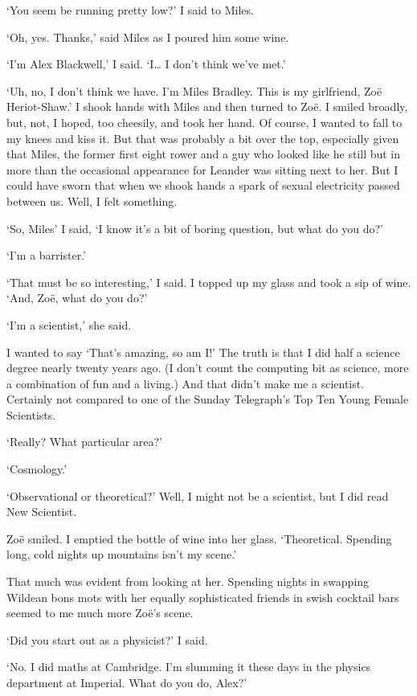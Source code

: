 `You seem be running pretty low?' I said to Miles.

`Oh, yes. Thanks,' said Miles as I poured him some wine.

`I'm Alex Blackwell,' I said. `I{\dots} I don't think we've met.'

`Uh, no, I don't think we have. I'm Miles Bradley. This is my
girlfriend, Zoë Heriot-Shaw.' I shook hands with Miles and then
turned to Zoë. I smiled broadly, but, not, I hoped, too
cheesily, and took her hand. Of course, I wanted to fall to my knees and kiss it. But
that was probably a bit over the top, especially given that
Miles, the former first eight rower and a guy who looked like he still
but in more than the occasional appearance for Leander was sitting
next to her. But I could have sworn that when we shook hands a spark
of sexual electricity passed between us. Well, I felt something.

`So, Miles' I said, `I know it's a bit of boring question, but what
do you do?'

`I'm a barrister.'

`That must be so interesting,' I said. I topped up my glass and
took a sip of wine. `And, Zoë, what do you do?'

`I'm a scientist,' she said.

I wanted to say `That's amazing, so am I!' The truth is that I did half a science degree nearly
twenty years ago. (I don't count the computing bit as science, more
a combination of fun and a living.) And that didn't make me a
scientist. Certainly not compared to one of the {\twelvesl Sunday
Telegraph}'s Top Ten Young Female Scientists.

`Really? What particular area?'

`Cosmology.'

`Observational or theoretical?' Well, I might not be a scientist,
but I did read {\twelvesl New Scientist}.

 Zoë smiled. I emptied the bottle of wine into her glass. `Theoretical. Spending long, cold nights up mountains
isn't my scene.'

That much was evident from looking at her. Spending nights in
swapping Wildean bons mots with her equally sophisticated friends in swish cocktail bars seemed
to me much more Zoë's scene.

`Did you start out as a physicist?' I said.

`No. I did maths at Cambridge. I'm slumming it these days
in the physics department at Imperial. What do you do, Alex?'


